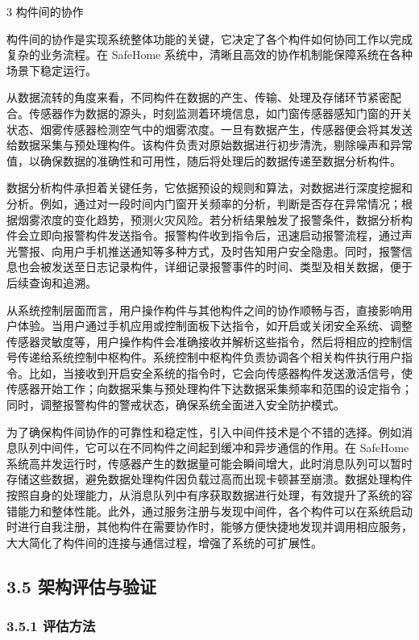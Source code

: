 3 构件间的协作

构件间的协作是实现系统整体功能的关键，它决定了各个构件如何协同工作以完成复杂的业务流程。在 SafeHome 系统中，清晰且高效的协作机制能保障系统在各种场景下稳定运行。

从数据流转的角度来看，不同构件在数据的产生、传输、处理及存储环节紧密配合。传感器作为数据的源头，时刻监测着环境信息，如门窗传感器感知门窗的开关状态、烟雾传感器检测空气中的烟雾浓度。一旦有数据产生，传感器便会将其发送给数据采集与预处理构件。该构件负责对原始数据进行初步清洗，剔除噪声和异常值，以确保数据的准确性和可用性，随后将处理后的数据传递至数据分析构件。

数据分析构件承担着关键任务，它依据预设的规则和算法，对数据进行深度挖掘和分析。例如，通过对一段时间内门窗开关频率的分析，判断是否存在异常情况；根据烟雾浓度的变化趋势，预测火灾风险。若分析结果触发了报警条件，数据分析构件会立即向报警构件发送指令。报警构件收到指令后，迅速启动报警流程，通过声光警报、向用户手机推送通知等多种方式，及时告知用户安全隐患。同时，报警信息也会被发送至日志记录构件，详细记录报警事件的时间、类型及相关数据，便于后续查询和追溯。

从系统控制层面而言，用户操作构件与其他构件之间的协作顺畅与否，直接影响用户体验。当用户通过手机应用或控制面板下达指令，如开启或关闭安全系统、调整传感器灵敏度等，用户操作构件会准确接收并解析这些指令，然后将相应的控制信号传递给系统控制中枢构件。系统控制中枢构件负责协调各个相关构件执行用户指令。比如，当接收到开启安全系统的指令时，它会向传感器构件发送激活信号，使传感器开始工作；向数据采集与预处理构件下达数据采集频率和范围的设定指令；同时，调整报警构件的警戒状态，确保系统全面进入安全防护模式。

为了确保构件间协作的可靠性和稳定性，引入中间件技术是个不错的选择。例如消息队列中间件，它可以在不同构件之间起到缓冲和异步通信的作用。在 SafeHome 系统高并发运行时，传感器产生的数据量可能会瞬间增大，此时消息队列可以暂时存储这些数据，避免数据处理构件因负载过高而出现卡顿甚至崩溃。数据处理构件按照自身的处理能力，从消息队列中有序获取数据进行处理，有效提升了系统的容错能力和整体性能。此外，通过服务注册与发现中间件，各个构件可以在系统启动时进行自我注册，其他构件在需要协作时，能够方便快捷地发现并调用相应服务，大大简化了构件间的连接与通信过程，增强了系统的可扩展性。

\subsection{3.5 架构评估与验证}\label{ux67b6ux6784ux8bc4ux4f30ux4e0eux9a8cux8bc1}

\subsubsection{3.5.1 评估方法}\label{ux8bc4ux4f30ux65b9ux6cd5}

